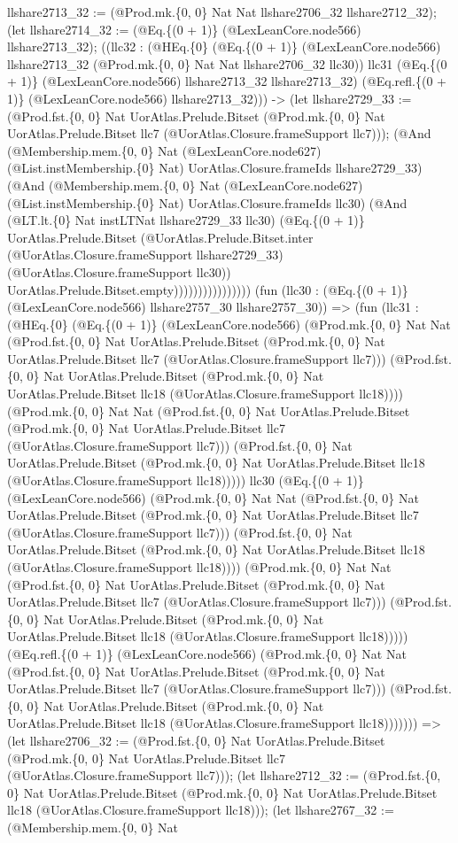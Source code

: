 \documentclass[11pt]{article}
\begin{document}
llshare2713\_32 := (@Prod.mk.\{0, 0\} Nat Nat llshare2706\_32 llshare2712\_32); (let llshare2714\_32 := (@Eq.\{(0 + 1)\} (@LexLeanCore.node566) llshare2713\_32); ((llc32 : (@HEq.\{0\} (@Eq.\{(0 + 1)\} (@LexLeanCore.node566) llshare2713\_32 (@Prod.mk.\{0, 0\} Nat Nat llshare2706\_32 llc30)) llc31 (@Eq.\{(0 + 1)\} (@LexLeanCore.node566) llshare2713\_32 llshare2713\_32) (@Eq.refl.\{(0 + 1)\} (@LexLeanCore.node566) llshare2713\_32))) -> (let llshare2729\_33 := (@Prod.fst.\{0, 0\} Nat UorAtlas.Prelude.Bitset (@Prod.mk.\{0, 0\} Nat UorAtlas.Prelude.Bitset llc7 (@UorAtlas.Closure.frameSupport llc7))); (@And (@Membership.mem.\{0, 0\} Nat (@LexLeanCore.node627) (@List.instMembership.\{0\} Nat) UorAtlas.Closure.frameIds llshare2729\_33) (@And (@Membership.mem.\{0, 0\} Nat (@LexLeanCore.node627) (@List.instMembership.\{0\} Nat) UorAtlas.Closure.frameIds llc30) (@And (@LT.lt.\{0\} Nat instLTNat llshare2729\_33 llc30) (@Eq.\{(0 + 1)\} UorAtlas.Prelude.Bitset (@UorAtlas.Prelude.Bitset.inter (@UorAtlas.Closure.frameSupport llshare2729\_33) (@UorAtlas.Closure.frameSupport llc30)) UorAtlas.Prelude.Bitset.empty)))))))))))))))) (fun (llc30 : (@Eq.\{(0 + 1)\} (@LexLeanCore.node566) llshare2757\_30 llshare2757\_30)) => (fun (llc31 : (@HEq.\{0\} (@Eq.\{(0 + 1)\} (@LexLeanCore.node566) (@Prod.mk.\{0, 0\} Nat Nat (@Prod.fst.\{0, 0\} Nat UorAtlas.Prelude.Bitset (@Prod.mk.\{0, 0\} Nat UorAtlas.Prelude.Bitset llc7 (@UorAtlas.Closure.frameSupport llc7))) (@Prod.fst.\{0, 0\} Nat UorAtlas.Prelude.Bitset (@Prod.mk.\{0, 0\} Nat UorAtlas.Prelude.Bitset llc18 (@UorAtlas.Closure.frameSupport llc18)))) (@Prod.mk.\{0, 0\} Nat Nat (@Prod.fst.\{0, 0\} Nat UorAtlas.Prelude.Bitset (@Prod.mk.\{0, 0\} Nat UorAtlas.Prelude.Bitset llc7 (@UorAtlas.Closure.frameSupport llc7))) (@Prod.fst.\{0, 0\} Nat UorAtlas.Prelude.Bitset (@Prod.mk.\{0, 0\} Nat UorAtlas.Prelude.Bitset llc18 (@UorAtlas.Closure.frameSupport llc18))))) llc30 (@Eq.\{(0 + 1)\} (@LexLeanCore.node566) (@Prod.mk.\{0, 0\} Nat Nat (@Prod.fst.\{0, 0\} Nat UorAtlas.Prelude.Bitset (@Prod.mk.\{0, 0\} Nat UorAtlas.Prelude.Bitset llc7 (@UorAtlas.Closure.frameSupport llc7))) (@Prod.fst.\{0, 0\} Nat UorAtlas.Prelude.Bitset (@Prod.mk.\{0, 0\} Nat UorAtlas.Prelude.Bitset llc18 (@UorAtlas.Closure.frameSupport llc18)))) (@Prod.mk.\{0, 0\} Nat Nat (@Prod.fst.\{0, 0\} Nat UorAtlas.Prelude.Bitset (@Prod.mk.\{0, 0\} Nat UorAtlas.Prelude.Bitset llc7 (@UorAtlas.Closure.frameSupport llc7))) (@Prod.fst.\{0, 0\} Nat UorAtlas.Prelude.Bitset (@Prod.mk.\{0, 0\} Nat UorAtlas.Prelude.Bitset llc18 (@UorAtlas.Closure.frameSupport llc18))))) (@Eq.refl.\{(0 + 1)\} (@LexLeanCore.node566) (@Prod.mk.\{0, 0\} Nat Nat (@Prod.fst.\{0, 0\} Nat UorAtlas.Prelude.Bitset (@Prod.mk.\{0, 0\} Nat UorAtlas.Prelude.Bitset llc7 (@UorAtlas.Closure.frameSupport llc7))) (@Prod.fst.\{0, 0\} Nat UorAtlas.Prelude.Bitset (@Prod.mk.\{0, 0\} Nat UorAtlas.Prelude.Bitset llc18 (@UorAtlas.Closure.frameSupport llc18))))))) => (let llshare2706\_32 := (@Prod.fst.\{0, 0\} Nat UorAtlas.Prelude.Bitset (@Prod.mk.\{0, 0\} Nat UorAtlas.Prelude.Bitset llc7 (@UorAtlas.Closure.frameSupport llc7))); (let llshare2712\_32 := (@Prod.fst.\{0, 0\} Nat UorAtlas.Prelude.Bitset (@Prod.mk.\{0, 0\} Nat UorAtlas.Prelude.Bitset llc18 (@UorAtlas.Closure.frameSupport llc18))); (let llshare2767\_32 := (@Membership.mem.\{0, 0\} Nat 
\end{document}
